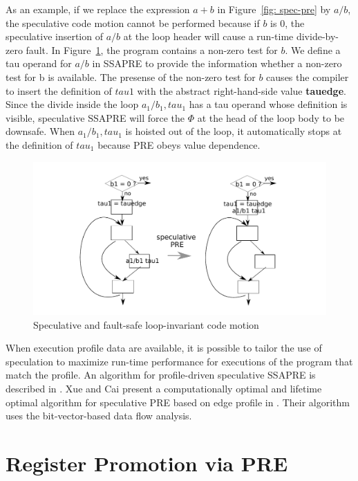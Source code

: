 As an example, if we replace the expression $a+b$ in Figure~\ref{fig: spec-pre}
by $a/b$, the speculative code motion cannot be performed because if $b$ is 0,
the speculative insertion of $a/b$ at the loop header will cause a run-time
divide-by-zero fault.  In Figure~\ref{fig: spec-div}, the program contains a 
non-zero test for $b$.  We define a tau operand for $a/b$ in SSAPRE to
provide the information whether a non-zero test for b is available.  The
presense of the non-zero test for $b$ causes the compiler to insert the
definition of $tau1$ with the abstract right-hand-side value {\bf tauedge}.
Since the divide inside the loop $a_1/b_1,tau_1$ has a tau operand whose
definition is visible, speculative SSAPRE will force the $\Phi$ at the head
of the loop body to be downsafe.  When $a_1/b_1,tau_1$ is hoisted out of the
loop, it automatically stops at the definition of $tau_1$ because PRE obeys
value dependence.

\begin{figure}
\centering
\includegraphics[scale=0.55]{fig-spec-div.pdf}
\caption{Speculative and fault-safe loop-invariant code motion}
\label{fig: spec-div}
\end{figure}

When execution profile data are available, it is possible to tailor the use
of speculation to maximize run-time performance for executions of the program
that match the profile.  An algorithm for profile-driven speculative SSAPRE
is described in \cite{Lo98}.  Xue and Cai present a computationally optimal
and lifetime optimal algorithm
for speculative PRE based on edge profile in \cite{Xue06}.  Their algorithm
uses the bit-vector-based data flow analysis.

\section{Register Promotion via PRE}

